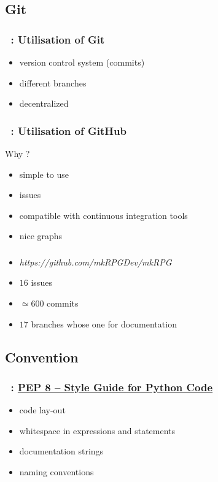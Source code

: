 \documentclass[11pt]{beamer}
\begin{document}
\subsection{Git}

\begin{frame}
    \frametitle{\secname~: Utilisation of Git}
    \begin{itemize}
        \item version control system (commits)
        \item different branches 
        \item decentralized
    \end{itemize}
\end{frame}

\begin{frame}
    \frametitle{\secname~: Utilisation of GitHub}
    Why ?
    \begin{itemize}
        \item simple to use
        \item issues
        \item compatible with continuous integration tools 
        \item nice graphs 
    \end{itemize}
\end{frame}

\begin{frame}
    \frametitle{\secname}
    \begin{itemize}
    	\item \textit{https://github.com/mkRPGDev/mkRPG}
        \item $16$ issues
        \item $\simeq 600$ commits
        \item $17$ branches whose one for documentation
    \end{itemize}
\end{frame}

\subsection{Convention}
\begin{frame}
    \frametitle{\secname~: \href{https://www.python.org/dev/peps/pep-0008/}{PEP 8 -- Style Guide for Python Code}}
    \begin{itemize}
        \item code lay-out
        \item whitespace in expressions and statements
        \item documentation strings
        \item naming conventions
    \end{itemize}
\end{frame}
\end{document}

